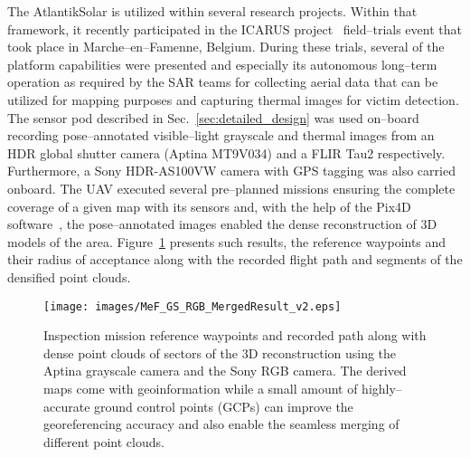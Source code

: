 The AtlantikSolar is utilized within several research projects. Within that framework, it recently participated in the ICARUS project~\cite{ICARUSwebsite} field--trials event that took place in Marche--en--Famenne, Belgium. During these trials, several of the platform capabilities were presented and especially its autonomous long--term operation as required by the SAR teams for collecting aerial data that can be utilized for mapping purposes and capturing thermal images for victim detection. The sensor pod described in Sec.~\ref{sec:detailed_design} was used on--board recording pose--annotated visible--light grayscale and thermal images from an HDR global shutter camera (Aptina MT9V034) and a FLIR Tau2 respectively. Furthermore, a Sony HDR-AS100VW camera with GPS tagging was also carried onboard. The UAV executed several pre--planned missions ensuring the complete coverage of a given map with its sensors and, with the help of the Pix4D software~\cite{Pix4Dsite}, the pose--annotated images enabled the dense reconstruction of $3\textrm{D}$ models of the area. Figure~\ref{fig:mef_icarus_reconstruction} presents such results, the reference waypoints and their radius of acceptance along with the recorded flight path and segments of the densified point clouds. 


%
\begin{figure}[htbp]
\begin{center}
  \texttt{[image: images/MeF\_GS\_RGB\_MergedResult\_v2.eps]} %
\end{center}
\caption{Inspection mission reference waypoints and recorded path along with dense point clouds of sectors of the $3\textrm{D}$ reconstruction using the Aptina grayscale camera and the Sony RGB camera. The derived maps come with geoinformation while a small amount of highly--accurate ground control points (GCPs) can improve the georeferencing accuracy and also enable the seamless merging of different point clouds.  }
\label{fig:mef_icarus_reconstruction}
\end{figure}
%

